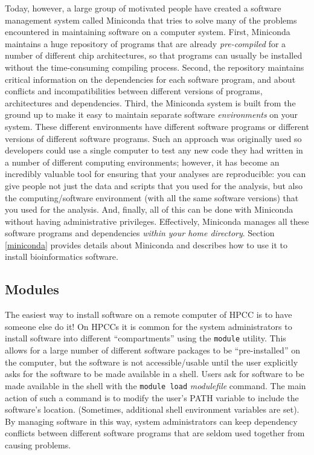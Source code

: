 \documentclass[]{krantz}
\begin{document}
Today, however, a large group of motivated people have created a software management
system called Miniconda that tries to solve many of the problems encountered in maintaining
software on a computer system. First, Miniconda maintains a huge repository of
programs that are already \emph{pre-compiled} for a number of different chip architectures, so that
programs can usually be installed without the time-consuming compiling process. Second, the repository
maintains critical information on the dependencies for each software program, and about
conflicts and incompatibilities between different versions of programs, architectures and
dependencies. Third, the Miniconda system is built from the ground up to make it easy to maintain
separate software \emph{environments} on your system. These different environments have different
software programs or different versions of different software programs. Such an approach
was originally used so developers could use a single computer to test any new code
they had written in a number of different
computing environments; however, it has become an incredibly valuable tool for ensuring
that your analyses are reproducible: you can give people not just the data and scripts that you
used for the analysis, but also the computing/software environment (with all the same
software versions) that you used for the analysis. And, finally, all of this
can be done with Miniconda without having administrative privileges. Effectively,
Miniconda manages all these software programs and dependencies \emph{within your home directory}.
Section \ref{miniconda} provides details about Miniconda and describes how to use it
to install bioinformatics software.

\hypertarget{modules}{%
\subsection{Modules}\label{modules}}

The easiest way to install software on a remote computer of HPCC is to have someone
else do it! On HPCCs it is common for the system administrators to install software into
different ``compartments'' using the \texttt{module} utility. This allows for a large number of
different software packages to be ``pre-installed'' on the computer, but the software
is not accessible/usable until the user explicitly asks for the software to be made
available in a shell. Users ask for software to be made available in the shell
with the \texttt{module\ load} \emph{modulefile} command. The main action of such a command is to
modify the user's PATH variable to include the software's location. (Sometimes, additional
shell environment variables are set). By managing software in this way, system administrators
can keep dependency conflicts
between different software programs that are seldom used together from causing problems.
\end{document}

